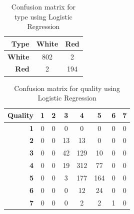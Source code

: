 \documentclass[twoside]{article}
\begin{document}
\begin{multicols}{2}
\begin{table}[H]
\caption{Confusion matrix for type using Logistic Regression}
\centering
\begin{tabular}{r||c|c}
\textbf{Type} & \textbf{White} & \textbf{Red} \\
\hline \hline
\textbf{White} & 802  & 2\\
\hline
\textbf{Red} & 2 & 194\\
\end{tabular}
\end{table}

\begin{table}[H]
\caption{Confusion matrix for quality using Logistic Regression}
\centering
\begin{tabular}{r||c|c|c|c|c|c|c}
\textbf{Quality} & \textbf{1} & \textbf{2} & \textbf{3} & \textbf{4} & \textbf{5} & \textbf{6} & \textbf{7}\\
\hline \hline
\textbf{1} & 0 & 0 & 0 & 0 & 0 & 0 & 0\\
\hline
\textbf{2} & 0 & 0 & 13 & 13 & 0 & 0 & 0\\
\hline
\textbf{3} & 0 & 0 & 42 & 129 & 10 & 0 & 0\\
\hline
\textbf{4} & 0 & 0 & 19 & 312 & 77 & 0 & 0\\
\hline
\textbf{5} & 0 & 0 & 3 & 177 & 164 & 0 & 0\\
\hline
\textbf{6} & 0 & 0 & 0 & 12 & 24 & 0 & 0\\
\hline
\textbf{7} & 0 & 0 & 0 & 2 & 2 & 1 & 0\\
\end{tabular}
\end{table}




\end{multicols}
\end{document}

